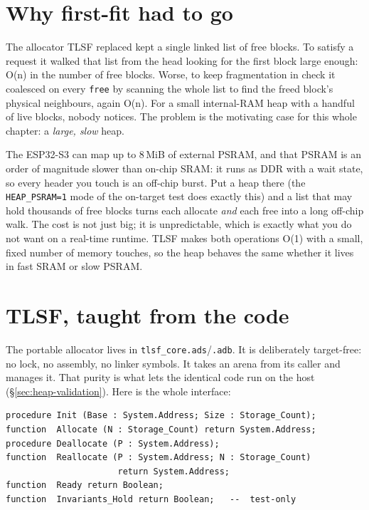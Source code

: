 \section{Why first-fit had to go}

The allocator TLSF replaced kept a single linked list of free blocks. To satisfy
a request it walked that list from the head looking for the first block large
enough: O(n) in the number of free blocks. Worse, to keep fragmentation in
check it coalesced on every \texttt{free} by scanning the whole list to find the
freed block's physical neighbours, again O(n). For a small internal-RAM heap
with a handful of live blocks, nobody notices. The problem is the motivating case
for this whole chapter: a \emph{large, slow} heap.

The ESP32-S3 can map up to 8\,MiB of external PSRAM, and that PSRAM is an order of
magnitude slower than on-chip SRAM: it runs as DDR with a wait state, so every
header you touch is an off-chip burst. Put a heap there (the
\texttt{HEAP\_PSRAM=1} mode of the on-target test does exactly this) and a list
that may hold thousands of free blocks turns each allocate \emph{and} each free
into a long off-chip walk. The cost is not just big; it is unpredictable, which is
exactly what you do not want on a real-time runtime. TLSF makes both operations
O(1) with a small, fixed number of memory touches, so the heap behaves the same
whether it lives in fast SRAM or slow PSRAM.


\section{TLSF, taught from the code}

The portable allocator lives in \texttt{tlsf\_core.ads}/\texttt{.adb}. It is
deliberately target-free: no lock, no assembly, no linker symbols. It takes an
arena from its caller and manages it. That purity is what lets the identical code
run on the host (\S\ref{sec:heap-validation}). Here is the whole interface:

\begin{lstlisting}
procedure Init (Base : System.Address; Size : Storage_Count);
function  Allocate (N : Storage_Count) return System.Address;
procedure Deallocate (P : System.Address);
function  Reallocate (P : System.Address; N : Storage_Count)
                      return System.Address;
function  Ready return Boolean;
function  Invariants_Hold return Boolean;   --  test-only
\end{lstlisting}

